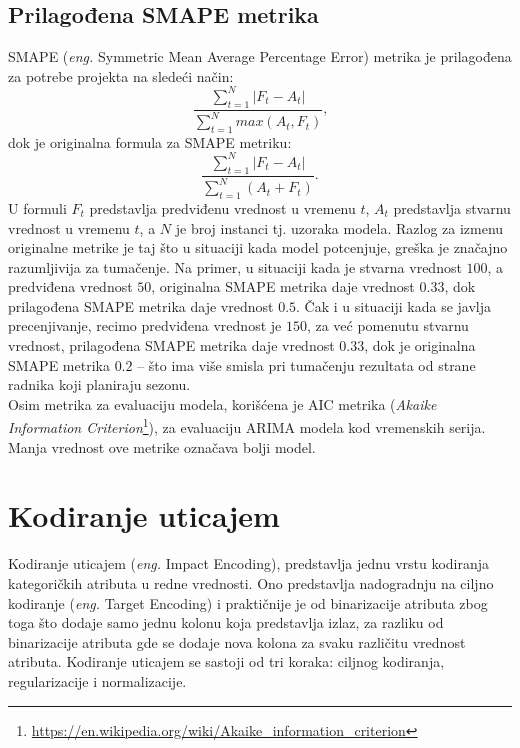\documentclass[12pt,oneside]{memoir}
\begin{document}
\subsection{Prilagođena SMAPE metrika} 
SMAPE (\textit{eng.} Symmetric Mean Average Percentage Error) metrika je prilagođena za potrebe projekta na sledeći način:
\begin{equation*}
\frac{\sum\limits_{t=1}^{N} |F_t - A_t|} {\sum\limits_{t=1}^{N}max(A_t, F_t)}\text{,}
\end{equation*}
dok je originalna formula za SMAPE metriku: 
\begin{equation*}
\frac{\sum\limits_{t=1}^{N} |F_t - A_t|} {\sum\limits_{t=1}^{N}(A_t + F_t)}\text{.}
\end{equation*}
U formuli $F_t$ predstavlja predviđenu vrednost u vremenu $t$, $A_t$ predstavlja stvarnu vrednost u vremenu $t$, a $N$ je broj instanci tj. uzoraka modela.
Razlog za izmenu originalne metrike je taj što u situaciji kada model potcenjuje, greška je značajno razumljivija za tumačenje. Na primer, u situaciji kada je stvarna vrednost $100$, a predviđena vrednost $50$, originalna SMAPE metrika daje vrednost $0.33$, dok prilagođena SMAPE metrika daje vrednost $0.5$. Čak i u situaciji kada se javlja precenjivanje, recimo predviđena vrednost je $150$, za već pomenutu stvarnu vrednost, prilagođena SMAPE metrika daje vrednost $0.33$, dok je originalna SMAPE metrika $0.2$ -- što ima više smisla pri tumačenju rezultata od strane radnika koji planiraju sezonu. \\
\newline
Osim metrika za evaluaciju modela, korišćena je AIC metrika (\textit{Akaike Information Criterion}\footnote{\url{https://en.wikipedia.org/wiki/Akaike_information_criterion}}), za evaluaciju ARIMA modela kod vremenskih serija. Manja vrednost ove metrike označava bolji model.

\section{Kodiranje uticajem}
\label{lbl: impact_encoding}
Kodiranje uticajem (\textit{eng.} Impact Encoding), predstavlja jednu vrstu kodiranja kategoričkih atributa u redne vrednosti. Ono predstavlja nadogradnju na ciljno kodiranje (\textit{eng.} Target Encoding) \cite{pargent2019benchmark} i praktičnije je od binarizacije atributa zbog toga što dodaje samo jednu kolonu koja predstavlja izlaz, za razliku od binarizacije atributa gde se dodaje nova kolona za svaku različitu vrednost atributa. Kodiranje uticajem se sastoji od tri koraka: ciljnog kodiranja, regularizacije i normalizacije.
\end{document}
